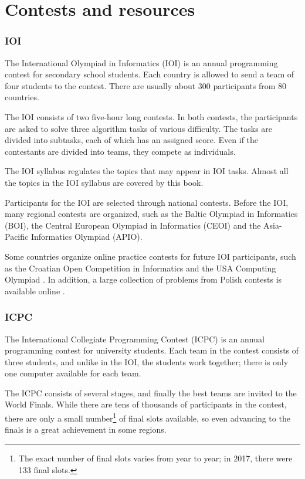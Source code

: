 \section{Contests and resources}

\subsubsection{IOI}

The International Olympiad in Informatics (IOI)
is an annual programming contest for
secondary school students.
Each country is allowed to send a team of
four students to the contest.
There are usually about 300 participants
from 80 countries.

The IOI consists of two five-hour long contests.
In both contests, the participants are asked to
solve three algorithm tasks of various difficulty.
The tasks are divided into subtasks,
each of which has an assigned score.
Even if the contestants are divided into teams,
they compete as individuals.

The IOI syllabus \cite{iois} regulates the topics
that may appear in IOI tasks.
Almost all the topics in the IOI syllabus
are covered by this book.

Participants for the IOI are selected through
national contests.
Before the IOI, many regional contests are organized,
such as the Baltic Olympiad in Informatics (BOI),
the Central European Olympiad in Informatics (CEOI)
and the Asia-Pacific Informatics Olympiad (APIO).

Some countries organize online practice contests
for future IOI participants,
such as the Croatian Open Competition in Informatics \cite{coci}
and the USA Computing Olympiad \cite{usaco}.
In addition, a large collection of problems from Polish contests
is available online \cite{main}.

\subsubsection{ICPC}

The International Collegiate Programming Contest (ICPC)
is an annual programming contest for university students.
Each team in the contest consists of three students,
and unlike in the IOI, the students work together;
there is only one computer available for each team.

The ICPC consists of several stages, and finally the
best teams are invited to the World Finals.
While there are tens of thousands of participants
in the contest, there are only a small number\footnote{The exact number of final
slots varies from year to year; in 2017, there were 133 final slots.} of final slots available,
so even advancing to the finals
is a great achievement in some regions.


